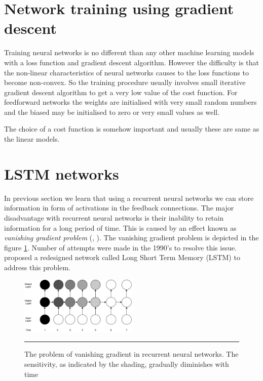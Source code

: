 \section {Network training using gradient descent}
Training neural networks is no different than any other machine learning models with a loss
function and gradient descent algorithm. However the difficulty is that the non-linear
characteristics of neural networks causes to the loss functions to become non-convex. So the
training procedure usually involves small iterative gradient descent algorithm to get a very low
value of the cost function. For feedforward networks the weights are initialised with very small
random numbers and the biased may be initialised to zero or very small values as well.

The choice of a cost function is somehow important and usually these are same as the linear models.

\section{LSTM networks}
In previous section we learn that using a recurrent neural networks we can store information in
form of activations in the feedback connections. The major disadvantage with recurrent neural
networks is their inability to retain information for a long period of time. This is caused by an
effect known as \emph{vanishing gradient problem} (\citet{bengio1994learning},
\citet{hochreiter2001gradient}). The vanishing gradient problem is depicted in the figure
\ref{fig:vanishingGradient}. Number of attempts were made in the 1990's to resolve this issue.
\citet{hochreiter1997long} proposed a redesigned network called Long Short Term Memory (LSTM) to
address this problem.

\begin{figure}[htbp]
  \centering
    \includegraphics[width=0.5\textwidth,height=0.5\textheight,keepaspectratio]{Figures/vanishing-gradient.pdf}
    \rule{35em}{0.5pt}
  \caption[Vanishing Gradient] {The problem of vanishing gradient in recurrent neural networks.
  The sensitivity, as indicated by the shading, gradually diminishes with time}
  \label{fig:vanishingGradient}
\end{figure}



